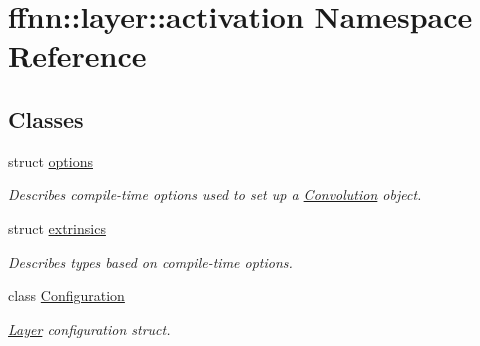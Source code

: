 \hypertarget{namespaceffnn_1_1layer_1_1activation}{\section{ffnn\-:\-:layer\-:\-:activation Namespace Reference}
\label{namespaceffnn_1_1layer_1_1activation}
}
\subsection*{Classes}
\begin{DoxyCompactItemize}
\item 
struct \hyperlink{structffnn_1_1layer_1_1activation_1_1options}{options}
\begin{DoxyCompactList}\small\item\em Describes compile-\/time options used to set up a \hyperlink{classffnn_1_1layer_1_1_convolution}{Convolution} object. \end{DoxyCompactList}\item 
struct \hyperlink{structffnn_1_1layer_1_1activation_1_1extrinsics}{extrinsics}
\begin{DoxyCompactList}\small\item\em Describes types based on compile-\/time options. \end{DoxyCompactList}\item 
class \hyperlink{classffnn_1_1layer_1_1activation_1_1_configuration}{Configuration}
\begin{DoxyCompactList}\small\item\em \hyperlink{classffnn_1_1layer_1_1_layer}{Layer} configuration struct. \end{DoxyCompactList}\end{DoxyCompactItemize}
